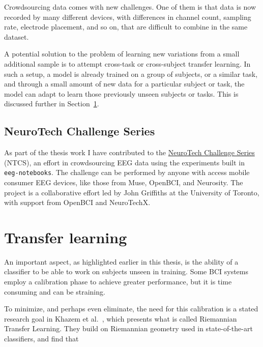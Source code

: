     Crowdsourcing data comes with new challenges. One of them is that data is now recorded by many different devices, with differences in channel count, sampling rate, electrode placement, and so on, that are difficult to combine in the same dataset. 

    A potential solution to the problem of learning new variations from a small additional sample is to attempt cross-task or cross-subject transfer learning. In such a setup, a model is already trained on a group of subjects, or a similar task, and through a small amount of new data for a particular subject or task, the model can adapt to learn those previously unseen subjects or tasks. This is discussed further in Section~\ref{section:transfer-learning}.

    \subsection{NeuroTech Challenge Series}\label{section:ntcs}

    As part of the thesis work I have contributed to the \href{https://neurotech-challenge.com/}{NeuroTech Challenge Series} (NTCS), an effort in crowdsourcing EEG data using the experiments built in \texttt{eeg-notebooks}. The challenge can be performed by anyone with access mobile consumer EEG devices, like those from Muse, OpenBCI, and Neurosity\@. The project is a collaborative effort led by John Griffiths at the University of Toronto, with support from OpenBCI and NeuroTechX.


\section{Transfer learning}\label{section:transfer-learning}

An important aspect, as highlighted earlier in this thesis, is the ability of a classifier to be able to work on subjects unseen in training. Some BCI systems employ a calibration phase to achieve greater performance, but it is time consuming and can be straining. 

To minimize, and perhaps even eliminate, the need for this calibration is a stated research goal in Khazem et al.~\cite{khazem_minimizing_2021}, which presents what is called Riemannian Transfer Learning. They build on Riemannian geometry used in state-of-the-art classifiers, and find that
